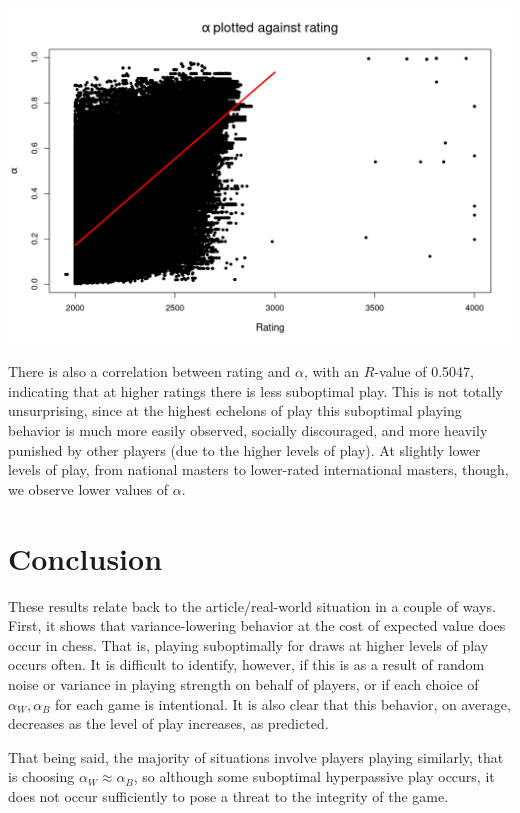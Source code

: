 \documentclass{article}
\begin{document}
\includegraphics[width=\textwidth]{./linear.png}

There is also a correlation between rating and $\alpha$, with an $R$-value of 0.5047, indicating that at higher ratings
there is less suboptimal play.
This is not totally unsurprising, since at the highest echelons of play this suboptimal playing behavior is much more easily
observed, socially discouraged, and more heavily punished by other players (due to the higher levels of play).
At slightly lower levels of play, from national masters to lower-rated international masters, though, we observe lower
values of $\alpha$.

\section{Conclusion}
These results relate back to the article/real-world situation in a couple of ways.
First, it shows that variance-lowering behavior at the cost of expected value does occur in chess.
That is, playing suboptimally for draws at higher levels of play occurs often.
It is difficult to identify, however, if this is as a result of random noise or variance in playing strength
on behalf of players, or if each choice of $\alpha_W, \alpha_B$ for each game is intentional.
It is also clear that this behavior, on average, decreases as the level of play increases, as predicted.

That being said, the majority of situations involve players playing similarly, that is choosing
$\alpha_W\approx \alpha_B$, so although some suboptimal hyperpassive play occurs, it does not occur
sufficiently to pose a threat to the integrity of the game.
\end{document}
